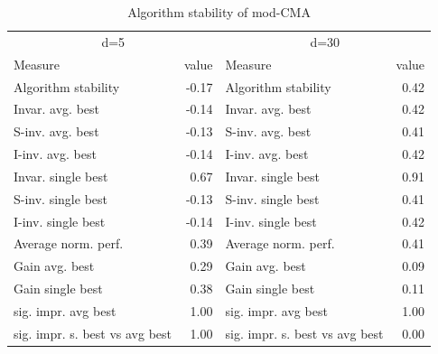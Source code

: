 \begin{table}
\caption{Algorithm stability of mod-CMA}
\begin{tabular}{lrlr}
\toprule
\multicolumn{2}{c}{d=5} & \multicolumn{2}{c}{d=30} \\
Measure & value & Measure & value \\
\midrule
Algorithm stability & -0.17 & Algorithm stability & 0.42 \\
Invar. avg. best & -0.14 & Invar. avg. best & 0.42 \\
S-inv. avg. best & -0.13 & S-inv. avg. best & 0.41 \\
I-inv. avg. best & -0.14 & I-inv. avg. best & 0.42 \\
Invar. single best & 0.67 & Invar. single best & 0.91 \\
S-inv. single best & -0.13 & S-inv. single best & 0.41 \\
I-inv. single best & -0.14 & I-inv. single best & 0.42 \\
Average norm. perf. & 0.39 & Average norm. perf. & 0.41 \\
Gain avg. best & 0.29 & Gain avg. best & 0.09 \\
Gain single best & 0.38 & Gain single best & 0.11 \\
sig. impr. avg best & 1.00 & sig. impr. avg best & 1.00 \\
sig. impr. s. best vs avg best & 1.00 & sig. impr. s. best vs avg best & 0.00 \\
\bottomrule
\end{tabular}
\end{table}
